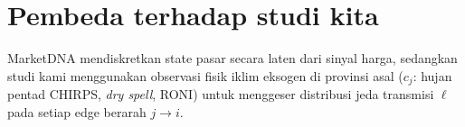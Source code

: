 \documentclass[11pt,a4paper]{article}
\begin{document}
\section{Pembeda terhadap studi kita}
MarketDNA mendiskretkan state pasar secara laten dari sinyal harga, sedangkan studi kami menggunakan observasi fisik iklim eksogen di provinsi asal ($c_j$: hujan pentad CHIRPS, \emph{dry spell}, RONI) untuk menggeser distribusi jeda transmisi $\ell$ pada setiap edge berarah $j \to i$.
\end{document}
